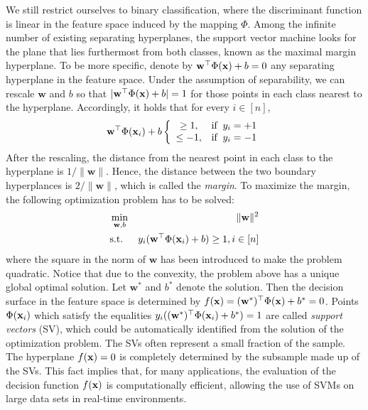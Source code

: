 We still restrict ourselves to binary classification, where the discriminant function is linear in the feature space induced by the mapping $\Phi$. Among the infinite number of existing separating hyperplanes, the support vector machine looks for the plane that lies furthermost from both classes, known as the maximal margin hyperplane. To be more specific, denote by $\mathbf w^\top\Phi(\mathbf{x})+b=0$ any separating hyperplane in the feature space. Under the assumption of separability, we can rescale $\mathbf w$ and $b$ so that $|\mathbf w^\top\Phi(\mathbf{x})+b|=1$ for those points in each class nearest to the hyperplane. Accordingly, it holds that for every $i\in[n]$,
\begin{eqnarray}
\mathbf w^\top\Phi(\mathbf{x}_i)+b
\left\{
\begin{array}{cl}
\geq 1, &\mbox{if}\;\;y_i=+1\\
\leq -1, &\mbox{if}\;\;y_i=-1
\end{array}
\right.
\end{eqnarray}
After the rescaling, the distance from the nearest point in each class to the hyperplane is $1/\|\mathbf w\|$. Hence, the distance between the two boundary hyperplances is $2/\|\mathbf w\|$, which is called the {\em margin}. To maximize the margin, the following optimization problem has to be solved:
\begin{eqnarray}
&\min_{\mathbf w,b}& \|\mathbf w\|^2\label{eqn:s-svm}\\
&\mbox{s.t.}&y_i(\mathbf w^\top\Phi(\x_i)+b)\geq 1,i\in[n]\nonumber
\end{eqnarray}
where the square in the norm of $\mathbf w$ has been introduced to make the problem quadratic. Notice that due to the convexity, the problem above has a unique global optimal solution. Let $\mathbf w^*$ and $b^*$ denote the solution. Then the decision surface in the feature space is determined by $f(\mathbf{x})=(\mathbf w^*)^\top\Phi(\mathbf{x})+b^*=0$. Points $\Phi(\mathbf{x}_i)$ which satisfy the equalities $y_i((\mathbf w^*)^\top\Phi(\mathbf{x}_i)+b^*)=1$ are called {\em support vectors} (SV), which could be automatically identified from the solution of the optimization problem. The SVs often represent a small fraction of the sample. The hyperplane $f(\mathbf{x}) = 0$ is completely determined by the subsample made up of the SVs. This fact implies that, for many applications, the evaluation of the decision function $f(\mathbf{x})$ is computationally efficient, allowing the use of SVMs on large data sets in real-time environments.

